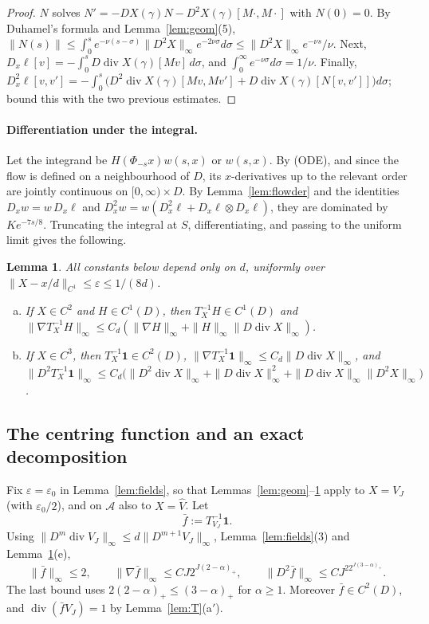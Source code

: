\documentclass[11pt]{article}
\newtheorem{lemma}[theorem]{Lemma}
\theoremstyle{definition}
\theoremstyle{remark}
\newcommand{\one}{\mathbf 1}
\newcommand{\dv}{\operatorname{div}}
\newcommand{\cA}{\mathcal A}
\begin{document}
\begin{proof}
$N$ solves $N'=-DX(\gamma)N-D^2X(\gamma)[M\cdot,M\cdot]$ with $N(0)=0$. By Duhamel's formula and Lemma~\ref{lem:geom}(5),
$\|N(s)\|\le\int_0^se^{-\nu(s-\sigma)}\|D^2X\|_\infty e^{-2\nu\sigma}d\sigma\le\|D^2X\|_\infty e^{-\nu s}/\nu$.
Next, $D_x\ell[v]=-\int_0^sD\dv X(\gamma)[Mv]\,d\sigma$, and $\int_0^\infty e^{-\nu\sigma}d\sigma=1/\nu$. Finally,
$D^2_x\ell[v,v']=-\int_0^s\big(D^2\dv X(\gamma)[Mv,Mv']+D\dv X(\gamma)[N[v,v']]\big)d\sigma$; bound this with the two previous estimates.
\end{proof}

\paragraph{Differentiation under the integral.} Let the integrand be $H(\Phi_{-s}x)w(s,x)$ or $w(s,x)$. By (ODE), and since the flow is defined on a neighbourhood of $D$, its $x$-derivatives up to the relevant order are jointly continuous on $[0,\infty)\times D$. By Lemma~\ref{lem:flowder} and the identities $D_xw=w\,D_x\ell$ and $D_x^2w=w(D_x^2\ell+D_x\ell\otimes D_x\ell)$, they are dominated by $Ke^{-7s/8}$. Truncating the integral at $S$, differentiating, and passing to the uniform limit gives the following.

\begin{lemma}\label{lem:Treg}
All constants below depend only on $d$, uniformly over $\|X-x/d\|_{C^1}\le\varepsilon\le1/(8d)$.
\begin{enumerate}[(a)]
\item[\textup{(d)}] If $X\in C^2$ and $H\in C^1(D)$, then $T^{-1}_XH\in C^1(D)$ and
$\|\nabla T^{-1}_XH\|_\infty\le C_d(\|\nabla H\|_\infty+\|H\|_\infty\|D\dv X\|_\infty)$.
\item[\textup{(e)}] If $X\in C^3$, then $T^{-1}_X\one\in C^2(D)$, $\|\nabla T^{-1}_X\one\|_\infty\le C_d\|D\dv X\|_\infty$, and
$\|D^2T_X^{-1}\one\|_\infty\le C_d\big(\|D^2\dv X\|_\infty+\|D\dv X\|_\infty^2+\|D\dv X\|_\infty\|D^2X\|_\infty\big)$.
\end{enumerate}
\end{lemma}

\subsection{The centring function and an exact decomposition}

Fix $\varepsilon=\varepsilon_0$ in Lemma~\ref{lem:fields}, so that Lemmas~\ref{lem:geom}--\ref{lem:Treg} apply to $X=V_J$ (with $\varepsilon_0/2$), and on $\cA$ also to $X=\hat V$. Let
\[
\bar f:=T^{-1}_{V_J}\one .
\]
Using $\|D^m\dv V_J\|_\infty\le d\|D^{m+1}V_J\|_\infty$, Lemma~\ref{lem:fields}(3) and Lemma~\ref{lem:Treg}(e),
\begin{equation}\label{eq:fbar}
\|\bar f\|_\infty\le2,\qquad\|\nabla\bar f\|_\infty\le CJ2^{J(2-\alpha)_+},\qquad\|D^2\bar f\|_\infty\le CJ^22^{J(3-\alpha)_+} .
\end{equation}
The last bound uses $2(2-\alpha)_+\le(3-\alpha)_+$ for $\alpha\ge1$. Moreover $\bar f\in C^2(D)$, and $\dv(\bar fV_J)=1$ by Lemma~\ref{lem:T}(a$'$).
\end{document}
